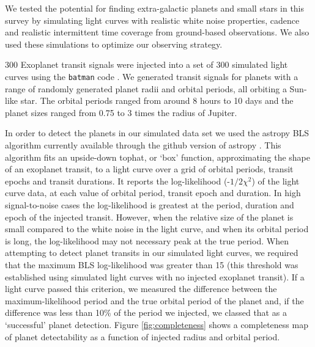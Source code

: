
We tested the potential for finding extra-galactic planets and small stars in
this survey by simulating light curves with realistic white noise properties,
cadence and realistic intermittent time coverage from ground-based
observations.
We also used these simulations to optimize our observing strategy.

300 Exoplanet transit signals were injected into a set of 300 simulated light
curves using the {\tt batman} code \citet{kreidburg2015}.
We generated transit signals for planets with a range of randomly generated
planet radii and orbital periods, all orbiting a Sun-like star.
The orbital periods ranged from around 8 hours to 10 days and the planet sizes
ranged from 0.75 to 3 times the radius of Jupiter.

In order to detect the planets in our simulated data set we used the astropy
BLS algorithm currently available through the github version of astropy
.
This algorithm fits an upside-down tophat, or `box' function, approximating
the shape of an exoplanet transit, to a light curve over a grid of orbital
periods, transit epochs and transit durations.
It reports the log-likelihood (-$1/2\chi^2$) of the light curve data, at each
value of orbital period, transit epoch and duration.
In high signal-to-noise cases the log-likelihood is greatest at the period,
duration and epoch of the injected transit.
However, when the relative size of the planet is small compared to the white
noise in the light curve, and when its orbital period is long, the
log-likelihood may not necessary peak at the true period.
When attempting to detect planet transits in our simulated light curves, we
required that the maximum BLS log-likelihood was greater than 15 (this
threshold was established using simulated light curves with no injected
exoplanet transit).
If a light curve passed this criterion, we measured the difference between the
maximum-likelihood period and the true orbital period of the planet and, if
the difference was less than 10\% of the period we injected, we classed that
as a `successful' planet detection.
Figure \ref{fig:completeness} shows a completeness map of planet detectability
as a function of injected radius and orbital period.


